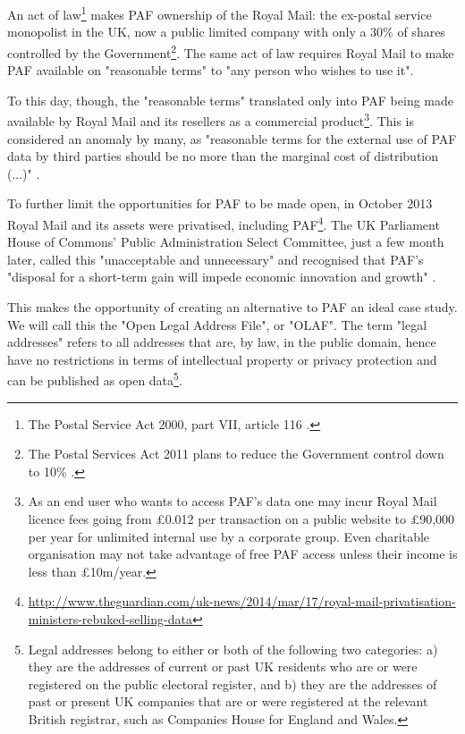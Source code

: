 \documentclass{llncs}
\begin{document}
    An act of law\footnote{The Postal Service Act 2000, part VII, article 116 \cite{postalserviceact2000}.} makes PAF ownership of the Royal Mail: the ex-postal service monopolist in the UK, now a public limited company with only a 30\% of shares controlled by the Government\footnote{The Postal Services Act 2011 plans to reduce the Government control down to 10\% \cite{postalserviceact2011}.}. The same act of law requires Royal Mail to make PAF available on "reasonable terms" to "any person who wishes to use it".
    
    To this day, though, the "reasonable terms" translated only into PAF being made available by Royal Mail and its resellers as a commercial product\footnote{As an end user who wants to access PAF's data one may incur Royal Mail licence fees going from \pounds0.012 per transaction on a public website to \pounds90,000 per year for unlimited internal use by a corporate group. Even charitable organisation may not take advantage of free PAF access unless their income is less than \pounds10m/year.}. This is considered an anomaly by many, as "reasonable terms for the external use of PAF data by third parties should be no more than the marginal cost of distribution (...)" \cite{odugresponse}. 

    To further limit the opportunities for PAF to be made open, in October 2013 Royal Mail and its assets were privatised, including PAF\footnote{\url{http://www.theguardian.com/uk-news/2014/mar/17/royal-mail-privatisation-ministers-rebuked-selling-data}}. The UK Parliament House of Commons' Public Administration Select Committee, just a few month later, called this "unacceptable and unnecessary" and recognised that PAF's "disposal for a short-term gain will impede economic innovation and growth" \cite{pascod}.

    This makes the opportunity of creating an alternative to PAF an ideal case study. We will call this the "Open Legal Address File", or "OLAF". The term "legal addresses" refers to all addresses that are, by law, in the public domain, hence have no restrictions in terms of intellectual property or privacy protection and can be published as open data\footnote{Legal addresses belong to either or both of the following two categories: a) they are the addresses of current or past UK residents who are or were registered on the public electoral register, and b) they are the addresses of past or present UK companies that are or were registered at the relevant British registrar, such as Companies House for England and Wales.}.
\end{document}
